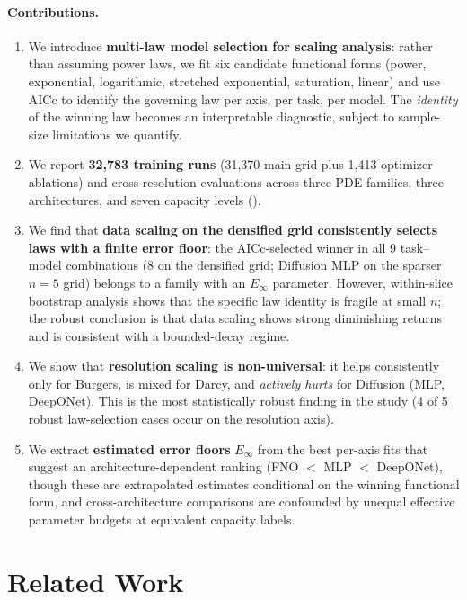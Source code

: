 \documentclass[11pt]{article}
\newcommand{\Einf}{E_\infty}
\newcommand{\totalRuns}{32{,}783}
\newcommand{\mainRuns}{31{,}370}
\newcommand{\ablationRuns}{1{,}413}
\begin{document}
\paragraph{Contributions.}
\begin{enumerate}
  \item We introduce \textbf{multi-law model selection for scaling
    analysis}: rather than assuming power laws, we fit six candidate
    functional forms (power, exponential, logarithmic, stretched
    exponential, saturation, linear) and use AICc to identify the
    governing law per axis, per task, per model. The \emph{identity}
    of the winning law becomes an interpretable diagnostic, subject to
    sample-size limitations we quantify.
  \item We report \textbf{\totalRuns{} training runs}
    (\mainRuns{} main grid plus \ablationRuns{} optimizer ablations)
    and cross-resolution evaluations across three PDE
    families, three architectures, and seven capacity levels
    ().
  \item We find that \textbf{data scaling on the densified grid
    consistently selects laws with a finite error floor}: the
    AICc-selected winner in all 9 task--model combinations (8 on the
    densified grid; Diffusion MLP on the sparser $n=5$ grid) belongs
    to a family with an $\Einf$ parameter. However, within-slice
    bootstrap analysis shows that the specific law identity is fragile
    at small $n$; the robust conclusion is that data scaling shows
    strong diminishing returns and is consistent with a bounded-decay
    regime.
  \item We show that \textbf{resolution scaling is non-universal}: it
    helps consistently only for Burgers, is mixed for Darcy, and
    \emph{actively hurts} for Diffusion (MLP, DeepONet). This is the
    most statistically robust finding in the study (4 of 5 robust
    law-selection cases occur on the resolution axis).
  \item We extract \textbf{estimated error floors}
    $\Einf$ from the best per-axis fits that suggest an
    architecture-dependent ranking (FNO $<$ MLP $<$ DeepONet),
    though these are extrapolated estimates conditional on the
    winning functional form, and cross-architecture comparisons
    are confounded by unequal effective parameter budgets at
    equivalent capacity labels.
\end{enumerate}


\section{Related Work}
\label{sec:related}
\end{document}
